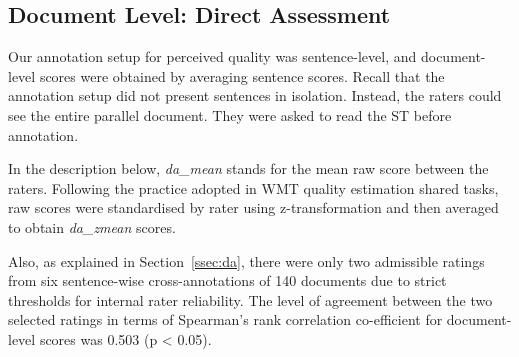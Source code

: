 

\subsection{\label{ssec:doc_da_res}Document Level: Direct Assessment}
Our annotation setup for perceived quality was sentence-level, and document-level scores were obtained by averaging sentence scores. Recall that the annotation setup did not present sentences in isolation. Instead, the raters could see the entire parallel document. They were asked to read the ST before annotation. 

In the description below, \textit{da\_mean} stands for the mean raw score between the raters. 
Following the practice adopted in \gls{WMT} quality estimation shared tasks, raw scores were standardised by rater using z-transformation and then averaged to obtain \textit{da\_zmean} scores. %

Also, as explained in Section~\ref{ssec:da}, there were only two admissible ratings from six sentence-wise cross-annotations of 140 documents due to strict thresholds for internal rater reliability. 
The level of agreement between the two selected ratings in terms of Spearman's rank correlation co-efficient for document-level scores was 0.503 (p < 0.05). %

